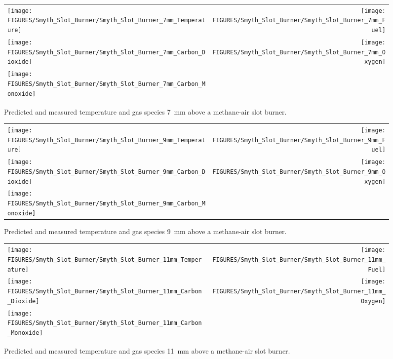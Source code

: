 \begin{figure}[h!]
\begin{tabular*}{\textwidth}{l@{\extracolsep{\fill}}r}
\texttt{[image: FIGURES/Smyth\_Slot\_Burner/Smyth\_Slot\_Burner\_7mm\_Temperature]} &
\texttt{[image: FIGURES/Smyth\_Slot\_Burner/Smyth\_Slot\_Burner\_7mm\_Fuel]} \\
\texttt{[image: FIGURES/Smyth\_Slot\_Burner/Smyth\_Slot\_Burner\_7mm\_Carbon\_Dioxide]} &
\texttt{[image: FIGURES/Smyth\_Slot\_Burner/Smyth\_Slot\_Burner\_7mm\_Oxygen]} \\
\texttt{[image: FIGURES/Smyth\_Slot\_Burner/Smyth\_Slot\_Burner\_7mm\_Carbon\_Monoxide]} &
\end{tabular*}
\caption[Temperature and gas species predictions 7~mm above burner, Smyth experiment]
{Predicted and measured temperature and gas species 7~mm above a methane-air slot burner.}
\label{Smyth_Slot_Burner_7}
\end{figure}

\begin{figure}[p]
\begin{tabular*}{\textwidth}{l@{\extracolsep{\fill}}r}
\texttt{[image: FIGURES/Smyth\_Slot\_Burner/Smyth\_Slot\_Burner\_9mm\_Temperature]} &
\texttt{[image: FIGURES/Smyth\_Slot\_Burner/Smyth\_Slot\_Burner\_9mm\_Fuel]} \\
\texttt{[image: FIGURES/Smyth\_Slot\_Burner/Smyth\_Slot\_Burner\_9mm\_Carbon\_Dioxide]} &
\texttt{[image: FIGURES/Smyth\_Slot\_Burner/Smyth\_Slot\_Burner\_9mm\_Oxygen]} \\
\texttt{[image: FIGURES/Smyth\_Slot\_Burner/Smyth\_Slot\_Burner\_9mm\_Carbon\_Monoxide]} &
\end{tabular*}
\caption[Temperature and gas species predictions 9~mm above burner, Smyth experiment]
{Predicted and measured temperature and gas species 9~mm above a methane-air slot burner.}
\label{Smyth_Slot_Burner_9}
\end{figure}

\begin{figure}[p]
\begin{tabular*}{\textwidth}{l@{\extracolsep{\fill}}r}
\texttt{[image: FIGURES/Smyth\_Slot\_Burner/Smyth\_Slot\_Burner\_11mm\_Temperature]} &
\texttt{[image: FIGURES/Smyth\_Slot\_Burner/Smyth\_Slot\_Burner\_11mm\_Fuel]} \\
\texttt{[image: FIGURES/Smyth\_Slot\_Burner/Smyth\_Slot\_Burner\_11mm\_Carbon\_Dioxide]} &
\texttt{[image: FIGURES/Smyth\_Slot\_Burner/Smyth\_Slot\_Burner\_11mm\_Oxygen]} \\
\texttt{[image: FIGURES/Smyth\_Slot\_Burner/Smyth\_Slot\_Burner\_11mm\_Carbon\_Monoxide]} &
\end{tabular*}
\caption[Temperature and gas species predictions 11~mm above burner, Smyth experiment]
{Predicted and measured temperature and gas species 11~mm above a methane-air slot burner.}
\label{Smyth_Slot_Burner_11}
\end{figure}



